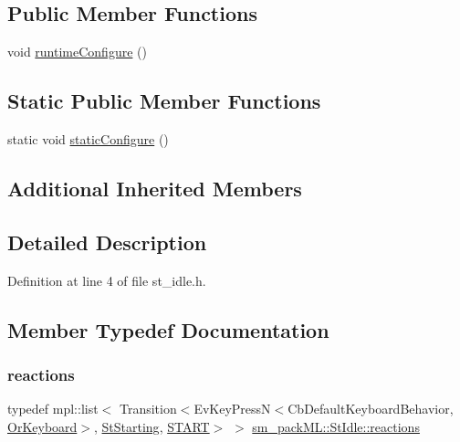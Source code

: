 \subsection*{Public Member Functions}
\begin{DoxyCompactItemize}
\item 
void \hyperlink{structsm__packML_1_1StIdle_a4b0427716c4054b1345876384066473e}{runtime\+Configure} ()
\end{DoxyCompactItemize}
\subsection*{Static Public Member Functions}
\begin{DoxyCompactItemize}
\item 
static void \hyperlink{structsm__packML_1_1StIdle_a946ecb6d3aeee4886ea37640ec630385}{static\+Configure} ()
\end{DoxyCompactItemize}
\subsection*{Additional Inherited Members}


\subsection{Detailed Description}


Definition at line 4 of file st\+\_\+idle.\+h.



\subsection{Member Typedef Documentation}
\mbox{\label{structsm__packML_1_1StIdle_aaa2867c5d09625334cfd937ddacc4f07}} 
\subsubsection{\texorpdfstring{reactions}{reactions}}
{\footnotesize\ttfamily typedef mpl\+::list$<$ Transition$<$Ev\+Key\+PressN$<$Cb\+Default\+Keyboard\+Behavior, \hyperlink{classsm__packML_1_1OrKeyboard}{Or\+Keyboard}$>$, \hyperlink{structsm__packML_1_1StStarting}{St\+Starting}, \hyperlink{structsm__packML_1_1StIdle_1_1START}{S\+T\+A\+RT}$>$ $>$ \hyperlink{structsm__packML_1_1StIdle_aaa2867c5d09625334cfd937ddacc4f07}{sm\+\_\+pack\+M\+L\+::\+St\+Idle\+::reactions}}



